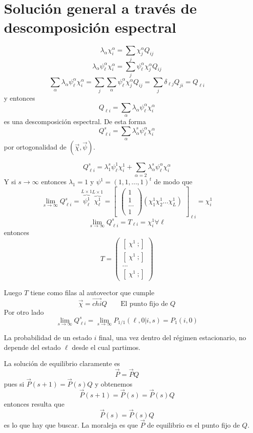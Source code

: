 \documentclass[10pt,oneside]{CBFT_book}
\begin{document}
\section{Solución general a través de descomposición espectral}

\[
	\lambda_\alpha \chi_i^\alpha = \sum_j \chi_j^\alpha Q_{ij} 
\]
\[
	\lambda_\alpha \psi_\ell^\alpha \chi_i^\alpha = \sum_j \psi_\ell^\alpha\chi_j^\alpha Q_{ij} 
\]
\[
	\sum_\alpha \lambda_\alpha \psi_\ell^\alpha \chi_i^\alpha = 
	\sum_j \sum_\alpha \psi_\ell^\alpha\chi_j^\alpha Q_{ij} =
	\sum_j \delta_{\ell j} Q_{ji} = Q_{\ell i}
\]
y entonces 
\[
	Q_{\ell i} = \sum_\alpha \lambda_\alpha \psi_\ell^\alpha \chi_i^\alpha
\]
es una descomposición espectral.
De esta forma 
\[
	Q_{\ell i}^s = \sum_\alpha \lambda_\alpha^s \psi_\ell^\alpha \chi_i^\alpha
\]
por ortogonalidad de $( \vec{\chi}, \vec{\psi} )$.

\[
	Q_{\ell i}^s = \lambda_1^s \psi_\ell^1 \chi_i^1 + 
	\sum_{\alpha=2} \lambda_\alpha^s \psi_\ell^\alpha \chi_i^\alpha
\]
Y si $s \to \infty$ entonces $\lambda_1 = 1$ y $\psi^1 = (1,1,...,1)^t$ de modo que 
\[
	\lim_{s\to \infty} Q^s_{\ell i} = \overbrace{\psi_\ell^1}^{L\times 1} 
	\overbrace{\chi_\ell^1}^{L\times 1} = \begin{bmatrix}
	                                       \begin{pmatrix}
	                                        1 \\
	                                        1 \\ 
	                                        ... \\
	                                        1
	                                       \end{pmatrix}
						(\chi_1^1 \chi_2^1 ... \chi_L^1 )
	                                      \end{bmatrix}_{\ell i}
	= \chi_i^1
\]
\[
	\lim_{s\to \infty} Q^s_{\ell i} = T_{\ell i} = \chi_i^1 \forall \ell
\]
entonces
\[
	T = \begin{pmatrix}
	     [ \; \chi^1 \ ; ] \\
	     [ \; \chi^1 \ ; ] \\
	     ...\\
	     [ \; \chi^1 \ ; ]
	    \end{pmatrix}
\]

Luego $T$ tiene como filas al autovector que cumple
\[
	\vec{\chi} = \vec{chi} Q \qquad \text{El punto fijo de $Q$}
\]
Por otro lado
\[
	\lim_{s\to \infty} Q^s_{\ell i} = \lim_{s\to \infty} P_{1/1}(\ell, 0 | i,s) = P_1(i,0)
\]

La probabilidad de un estado $i$ final, una vez dentro del régimen estacionario, no depende del estado
$\ell$ desde el cual partimos.

La solución de equilibrio claramente es
\[
	\vec{P} = \vec{P} Q 
\]
pues si $\vec{P}(s+1) = \vec{P}(s)Q$ y obtenemos
\[
	\vec{P}(s+1) = \vec{P}(s) = \vec{P}(s)Q
\]
entonces resulta que 
\[
	\vec{P}(s)  = \vec{P}(s) Q
\]
es lo que hay que buscar.
La moraleja es que $\vec{P}$ de equilibrio es el punto fijo de $Q$.

\end{document}
